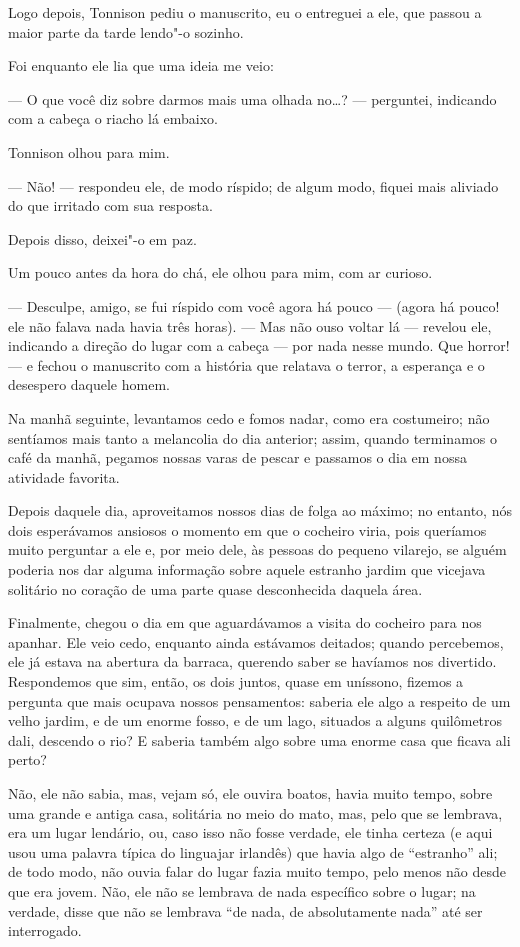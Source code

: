 Logo depois, Tonnison pediu o manuscrito, eu o entreguei a ele, que passou a maior parte da tarde lendo"-o sozinho.

Foi enquanto ele lia que uma ideia me veio:

--- O que você diz sobre darmos mais uma olhada no\ldots{}? --- perguntei, indicando com a cabeça o riacho lá embaixo.

Tonnison olhou para mim. 

--- Não! --- respondeu ele, de modo ríspido; de algum modo, fiquei mais
aliviado do que irritado com sua resposta.

Depois disso, deixei"-o em paz.

Um pouco antes da hora do chá, ele olhou para mim, com ar curioso.

--- Desculpe, amigo, se fui ríspido com você agora há pouco --- (agora há pouco! ele não falava nada havia três
horas). --- Mas não ouso voltar lá --- revelou ele, indicando a direção do lugar com a cabeça --- por nada nesse mundo. Que
horror! --- e fechou o manuscrito com a história que relatava o terror, a esperança e o desespero daquele homem.

Na manhã seguinte, levantamos cedo e fomos nadar, como era costumeiro; não sentíamos mais tanto a melancolia do dia
anterior; assim, quando terminamos o café da manhã, pegamos nossas varas de pescar e passamos o dia em nossa
atividade favorita.

Depois daquele dia, aproveitamos nossos dias de folga ao máximo; no entanto, nós dois esperávamos ansiosos o momento
em que o cocheiro viria, pois queríamos muito perguntar a ele e, por meio dele, às pessoas do pequeno vilarejo, se
alguém poderia nos dar alguma informação sobre aquele estranho jardim que vicejava solitário no coração de uma parte
quase desconhecida daquela área.

Finalmente, chegou o dia em que aguardávamos a visita do cocheiro para nos apanhar. Ele veio cedo, enquanto ainda
estávamos deitados; quando percebemos, ele já estava na abertura da barraca, querendo saber se havíamos nos
divertido. Respondemos que sim, então, os dois juntos, quase em uníssono, fizemos a pergunta que mais ocupava nossos
pensamentos: saberia ele algo a respeito de um velho jardim, e de um enorme fosso, e de um lago, situados a alguns
quilômetros dali, descendo o rio? E saberia também algo sobre uma enorme casa que ficava ali perto?

Não, ele não sabia, mas, vejam só, ele ouvira boatos, havia muito tempo, sobre uma grande e antiga casa, solitária no meio
do mato, mas, pelo que se lembrava, era um lugar lendário, ou, caso isso não fosse verdade, ele tinha certeza (e aqui
usou uma palavra típica do linguajar irlandês) que havia algo de “estranho” ali; de todo modo, não ouvia falar do lugar
fazia muito tempo, pelo menos não desde que era jovem. Não, ele não se lembrava de nada específico sobre o lugar; na
verdade, disse que não se lembrava “de nada, de absolutamente nada” até ser interrogado.

